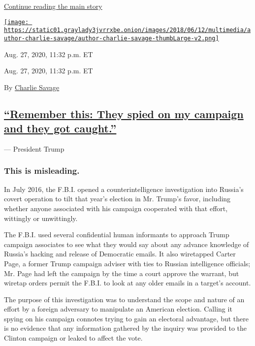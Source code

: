 \protect\hyperlink{after-dfp-ad-mid2}{Continue reading the main story}

\href{https://www.nytimes3xbfgragh.onion/by/charlie-savage}{\texttt{[image: https://static01.graylady3jvrrxbe.onion/images/2018/06/12/multimedia/author-charlie-savage/author-charlie-savage-thumbLarge-v2.png]}}

Aug. 27, 2020, 11:32 p.m. ET

Aug. 27, 2020, 11:32 p.m. ET

By \href{https://www.nytimes3xbfgragh.onion/by/charlie-savage}{Charlie
Savage}

\hypertarget{remember-this-they-spied-on-my-campaign-and-they-got-caught}{%
\subsection{\texorpdfstring{\protect\hyperlink{remember-this-they-spied-on-my-campaign-and-they-got-caught}{``Remember
this: They spied on my campaign and they got
caught.''}}{``Remember this: They spied on my campaign and they got caught.''}}\label{remember-this-they-spied-on-my-campaign-and-they-got-caught}}

--- President Trump

\hypertarget{this-is-misleading--1}{%
\subsubsection{\texorpdfstring{\textbf{This is misleading.}
}{This is misleading. }}\label{this-is-misleading--1}}

In July 2016, the F.B.I. opened a counterintelligence investigation into
Russia's covert operation to tilt that year's election in Mr. Trump's
favor, including whether anyone associated with his campaign cooperated
with that effort, wittingly or unwittingly.

The F.B.I. used several confidential human informants to approach Trump
campaign associates to see what they would say about any advance
knowledge of Russia's hacking and release of Democratic emails. It also
wiretapped Carter Page, a former Trump campaign adviser with ties to
Russian intelligence officials; Mr. Page had left the campaign by the
time a court approve the warrant, but wiretap orders permit the F.B.I.
to look at any older emails in a target's account.

The purpose of this investigation was to understand the scope and nature
of an effort by a foreign adversary to manipulate an American election.
Calling it spying on his campaign connotes trying to gain an electoral
advantage, but there is no evidence that any information gathered by the
inquiry was provided to the Clinton campaign or leaked to affect the
vote.

